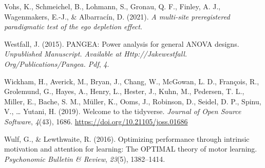 \documentclass[
  man, donotrepeattitle,mask,floatsintext]{apa7}
\newlength{\cslhangindent}
\newlength{\cslentryspacingunit} %
\newenvironment{CSLReferences}[2] %
 {%
  \setlength{\parindent}{0pt}
  \ifodd #1
  \let\oldpar\par
  \def\par{\hangindent=\cslhangindent\oldpar}
  \fi
  \setlength{\parskip}{#2\cslentryspacingunit}
 }%
 {}
\begin{document}
\begin{CSLReferences}{1}{0}
\leavevmode{}%
Vohs, K., Schmeichel, B., Lohmann, S., Gronau, Q. F., Finley, A. J., Wagenmakers, E.-J., \& Albarracín, D. (2021). \emph{A multi-site preregistered paradigmatic test of the ego depletion effect}.

\leavevmode{}%
Westfall, J. (2015). PANGEA: Power analysis for general ANOVA designs. \emph{Unpublished Manuscript. Available at Http://Jakewestfall. Org/Publications/Pangea. Pdf}, \emph{4}.

\leavevmode{}%
Wickham, H., Averick, M., Bryan, J., Chang, W., McGowan, L. D., François, R., Grolemund, G., Hayes, A., Henry, L., Hester, J., Kuhn, M., Pedersen, T. L., Miller, E., Bache, S. M., Müller, K., Ooms, J., Robinson, D., Seidel, D. P., Spinu, V., \ldots{} Yutani, H. (2019). Welcome to the {tidyverse}. \emph{Journal of Open Source Software}, \emph{4}(43), 1686. \url{https://doi.org/10.21105/joss.01686}

\leavevmode{}%
Wulf, G., \& Lewthwaite, R. (2016). Optimizing performance through intrinsic motivation and attention for learning: The OPTIMAL theory of motor learning. \emph{Psychonomic Bulletin \& Review}, \emph{23}(5), 1382--1414.

\end{CSLReferences}
\end{document}
